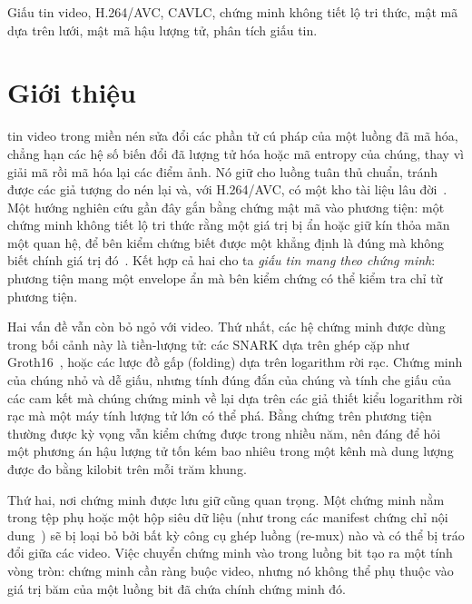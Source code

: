 \documentclass[journal]{IEEEtran}
\begin{document}
\begin{IEEEkeywords}
Giấu tin video, H.264/AVC, CAVLC, chứng minh không tiết lộ tri thức, mật mã
dựa trên lưới, mật mã hậu lượng tử, phân tích giấu tin.
\end{IEEEkeywords}

\section{Giới thiệu}
\label{sec:intro}

 tin video trong miền nén sửa đổi các phần tử cú pháp
của một luồng đã mã hóa, chẳng hạn các hệ số biến đổi đã lượng tử hóa hoặc mã
entropy của chúng, thay vì giải mã rồi mã hóa lại các điểm ảnh. Nó giữ cho
luồng tuân thủ chuẩn, tránh được các giả tượng do nén lại và, với H.264/AVC,
có một kho tài liệu lâu đời~\cite{ref:liu19review,ref:kunhoth23,ref:mstafa16}.
Một hướng nghiên cứu gần đây gắn bằng chứng mật mã vào phương tiện: một chứng
minh không tiết lộ tri thức rằng một giá trị bị ẩn hoặc giữ kín thỏa mãn một
quan hệ, để bên kiểm chứng biết được một khẳng định là đúng mà không biết chính
giá trị đó~\cite{ref:photoproof,ref:zkimg,ref:veritas,ref:vimz,ref:eva,ref:zkwagon}.
Kết hợp cả hai cho ta \emph{giấu tin mang theo chứng minh}: phương tiện mang
một envelope ẩn mà bên kiểm chứng có thể kiểm tra chỉ từ phương tiện.

Hai vấn đề vẫn còn bỏ ngỏ với video. Thứ nhất, các hệ chứng minh được dùng
trong bối cảnh này là tiền-lượng tử: các SNARK dựa trên ghép cặp như
Groth16~\cite{ref:groth16}, hoặc các lược đồ gấp (folding) dựa trên logarithm
rời rạc. Chứng minh của chúng nhỏ và dễ giấu, nhưng tính đúng đắn của chúng và
tính che giấu của các cam kết mà chúng chứng minh về lại dựa trên các giả thiết
kiểu logarithm rời rạc mà một máy tính lượng tử lớn có thể phá. Bằng chứng trên
phương tiện thường được kỳ vọng vẫn kiểm chứng được trong nhiều năm, nên đáng
để hỏi một phương án hậu lượng tử tốn kém bao nhiêu trong một kênh mà dung lượng
được đo bằng kilobit trên mỗi trăm khung.

Thứ hai, nơi chứng minh được lưu giữ cũng quan trọng. Một chứng minh nằm trong
tệp phụ hoặc một hộp siêu dữ liệu (như trong các manifest chứng chỉ nội
dung~\cite{ref:c2pa}) sẽ bị loại bỏ bởi bất kỳ công cụ ghép luồng (re-mux) nào
và có thể bị tráo đổi giữa các video. Việc chuyển chứng minh vào trong luồng bit
tạo ra một tính vòng tròn: chứng minh cần ràng buộc video, nhưng nó không thể
phụ thuộc vào giá trị băm của một luồng bit đã chứa chính chứng minh đó.
\end{document}

